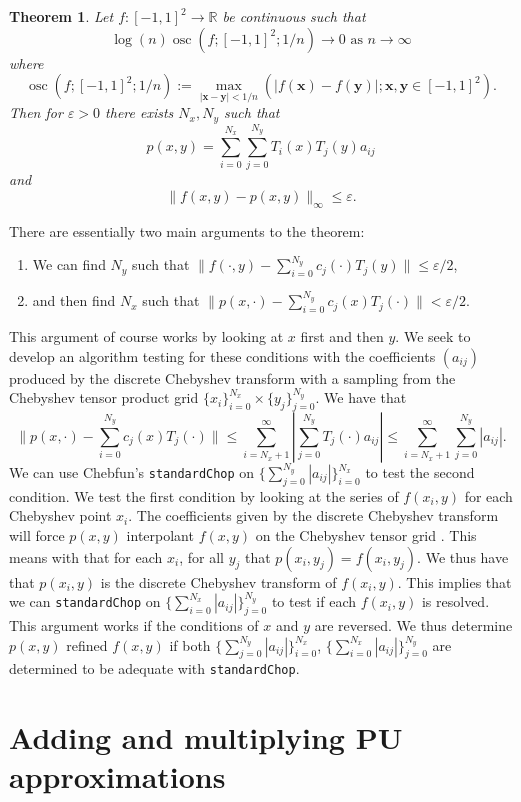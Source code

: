 \documentclass{article}
\DeclareMathOperator*{\osc}{osc}
\newtheorem{theorem}{Theorem}[section]
\newcommand{\R}{\mathbb{R}}
\newcommand{\vect}[1]{\mathbf{#1}}
\begin{document}
\begin{theorem} 
Let $f:[-1,1]^2 \to \R$ be continuous such that
$$
\log(n)\osc(f;[-1,1]^2;1/n)\to 0 \text{ as } n\to \infty
$$
where
$$
\osc(f;[-1,1]^2;1/n):=\max_{|{\vect{x}-\vect{y}}|<1/n}(|f(\vect{x})-f(\vect{y})|;\vect{x},\vect{y} \in [-1,1]^2).
$$
Then for $\varepsilon>0$ there exists $N_x,N_y$ such that
$$
p(x,y) = \sum_{i=0}^{N_x} \sum_{j=0}^{N_y} T_i(x)T_j(y)a_{ij}
$$
and
$$
\|f(x,y)-p(x,y)\|_{\infty} \leq \varepsilon.
$$
 \end{theorem}
There are essentially two main arguments to the theorem:
\begin{enumerate}
\item We can find $N_y$ such that $\|f(\cdot,y) -\sum_{i=0}^{N_y} c_j(\cdot)T_j(y) \| \leq \varepsilon/2$,
\item and then find $N_x$ such that $\|p(x,\cdot) - \sum_{i=0}^{N_y} c_j(x)T_j(\cdot)\|<\varepsilon/2$.
\end{enumerate}
This argument of course works by looking at $x$ first and then $y$. We seek to develop an algorithm testing for these conditions with the coefficients $(a_{ij})$ produced by the discrete Chebyshev transform with a sampling from the Chebyshev tensor product grid $\{x_i\}_{i=0}^{N_x} \times \{y_j\}_{j=0}^{N_y}$. We have that
\begin{equation}
\|p(x,\cdot) - \sum_{i=0}^{N_y} c_j(x)T_j(\cdot)\| \leq \sum_{i=N_x+1}^{\infty} | \sum_{j=0}^{N_y} T_j(\cdot) a_{ij}	 | \leq \sum_{i=N_x+1}^{\infty} \sum_{j=0}^{N_y} |a_{ij}|.
\end{equation}
We can use Chebfun's {\tt standardChop} on $\{\sum_{j=0}^{N_y} |a_{ij}|\}_{i=0}^{N_x}$ to test the second condition. We test the first condition by looking at the series of $f(x_i,y)$ for each Chebyshev point $x_i$. The coefficients given by the discrete Chebyshev transform will force $p(x,y)$ interpolant $f(x,y)$ on the Chebyshev tensor grid \cite{mason2002chebyshev}. This means with that for each $x_i$, for all $y_j$ that $p(x_i,y_j) = f(x_i,y_j)$. We thus have that $p(x_i,y)$ is the discrete Chebyshev transform of $f(x_i,y)$. This implies that we can {\tt standardChop} on $\{\sum_{i=0}^{N_x} |a_{ij}|\}_{j=0}^{N_y}$ to test if each $f(x_i,y)$ is resolved. This argument works if the conditions of $x$ and $y$ are reversed. We thus determine $p(x,y)$ refined $f(x,y)$ if both $\{\sum_{j=0}^{N_y} |a_{ij}|\}_{i=0}^{N_x}$, $\{\sum_{i=0}^{N_x} |a_{ij}|\}_{j=0}^{N_y}$ are determined to be adequate with {\tt standardChop}.

\section{Adding and multiplying PU approximations}
\end{document}
